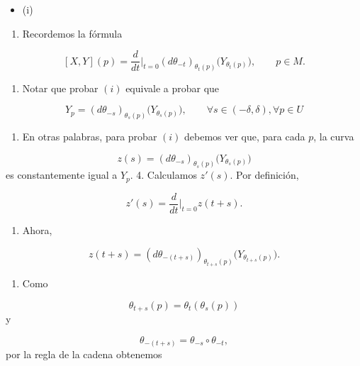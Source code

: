 \begin{bookproof}{}
\begin{itemize}
\item (i)
\end{itemize}
\begin{enumerate}
\item Recordemos la fórmula
\end{enumerate}
\[
[X,Y](p)=\frac{d}{dt}\Big|_{t=0}(d\theta_{-t})_{\theta_t(p)}\big(Y_{\theta_t(p)}\big),\qquad p\in M.
\]
\begin{enumerate}[start=2]
\item Notar que probar $(i)$ equivale a probar que
\end{enumerate}
\[
Y_p=(d\theta_{-s})_{\theta_s(p)}\big(Y_{\theta_s(p)}\big),\qquad \forall s\in (-\delta ,\delta),\forall p\in U
\]
\begin{enumerate}[start=3]
\item En otras palabras, para probar $(i)$ debemos ver que, para cada $p$, la curva
\end{enumerate}
\[
z(s)=(d\theta_{-s})_{\theta_s(p)}\big(Y_{\theta_s(p)}\big)
\]
es constantemente igual a $Y_p$. 4. Calculamos $z'(s)$. Por definición,

\[
z'(s)=\frac{d}{dt}\Big|_{t=0}z(t+s).
\]
\begin{enumerate}[start=5]
\item Ahora,
\end{enumerate}
\[
z(t+s)=(d\theta_{-(t+s)})_{\theta_{t+s}(p)}\big(Y_{\theta_{t+s}(p)}\big).
\]
\begin{enumerate}[start=6]
\item Como
\end{enumerate}
\[
\theta_{t+s}(p)=\theta_t(\theta_s(p))
\]
y

\[
\theta_{-(t+s)}=\theta_{-s}\circ\theta_{-t},
\]
por la regla de la cadena obtenemos


\end{bookproof}
